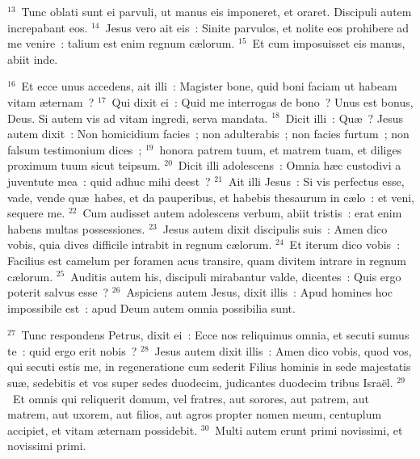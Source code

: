 ${}^{13}$~Tunc oblati sunt ei parvuli, ut manus eis imponeret, et oraret. Discipuli autem increpabant eos.
${}^{14}$~Jesus vero ait eis~: Sinite parvulos, et nolite eos prohibere ad me venire~: talium est enim regnum c\ae lorum.
${}^{15}$~Et cum imposuisset eis manus, abiit inde.


${}^{16}$~Et ecce unus accedens, ait illi~: Magister bone, quid boni faciam ut habeam vitam \ae ternam~?
${}^{17}$~Qui dixit ei~: Quid me interrogas de bono~? Unus est bonus, Deus. Si autem vis ad vitam ingredi, serva mandata.
${}^{18}$~Dicit illi~: Qu\ae~? Jesus autem dixit~: Non homicidium facies~; non adulterabis~; non facies furtum~; non falsum testimonium dices~;
${}^{19}$~honora patrem tuum, et matrem tuam, et diliges proximum tuum sicut teipsum.
${}^{20}$~Dicit illi adolescens~: Omnia h\ae c custodivi a juventute mea~: quid adhuc mihi deest~?
${}^{21}$~Ait illi Jesus~: Si vis perfectus esse, vade, vende qu\ae\ habes, et da pauperibus, et habebis thesaurum in c\ae lo~: et veni, sequere me.
${}^{22}$~Cum audisset autem adolescens verbum, abiit tristis~: erat enim habens multas possessiones.
${}^{23}$~Jesus autem dixit discipulis suis~: Amen dico vobis, quia dives difficile intrabit in regnum c\ae lorum.
${}^{24}$~Et iterum dico vobis~: Facilius est camelum per foramen acus transire, quam divitem intrare in regnum c\ae lorum.
${}^{25}$~Auditis autem his, discipuli mirabantur valde, dicentes~: Quis ergo poterit salvus esse~?
${}^{26}$~Aspiciens autem Jesus, dixit illis~: Apud homines hoc impossibile est~: apud Deum autem omnia possibilia sunt.


${}^{27}$~Tunc respondens Petrus, dixit ei~: Ecce nos reliquimus omnia, et secuti sumus te~: quid ergo erit nobis~?
${}^{28}$~Jesus autem dixit illis~: Amen dico vobis, quod vos, qui secuti estis me, in regeneratione cum sederit Filius hominis in sede majestatis su\ae , sedebitis et vos super sedes duodecim, judicantes duodecim tribus Isra\"el.
${}^{29}$~Et omnis qui reliquerit domum, vel fratres, aut sorores, aut patrem, aut matrem, aut uxorem, aut filios, aut agros propter nomen meum, centuplum accipiet, et vitam \ae ternam possidebit.
${}^{30}$~Multi autem erunt primi novissimi, et novissimi primi.

